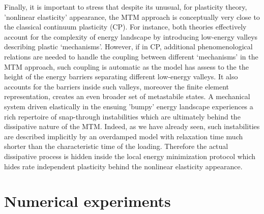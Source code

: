 \documentclass[aps,
superscriptaddress,notitlepage]{revtex4-1}
\begin{document}
 

 
Finally, it is important to stress that  despite its unusual, for plasticity theory, 'nonlinear elasticity' appearance, the MTM approach is  conceptually very close to the classical continuum plasticity (CP). For instance, both theories effectively account for the complexity of energy landscape by introducing low-energy valleys describing plastic `mechanisms'. However, if in CP, additional phenomenological  relations are needed to handle the coupling between different `mechanisms' \cite{Franciosi1985-cu,Cuitino2021-ps,Roters2010-rm,Dawson2000-ca,Bertin2023}
in the MTM approach, such coupling is automatic  as the model has  assess to the the height   of the energy barriers separating different low-energy valleys. It  also accounts for the barriers inside such valleys, moreover the   finite element representation, creates an even  broader set  of metastabile states.   A mechanical system driven elastically in the ensuing 'bumpy' energy  landscape   experiences a rich repertoire of snap-through instabilities which are ultimately behind the dissipative nature of the MTM.  Indeed, as we have already seen, such  instabilities are described implicitly by an overdamped model with relaxation time much shorter than the characteristic time of the loading. Therefore  the actual dissipative process is hidden inside the  local energy minimization protocol which hides   rate independent   plasticity behind the nonlinear elasticity appearance.




 \section{Numerical experiments}

 
   
\end{document}
